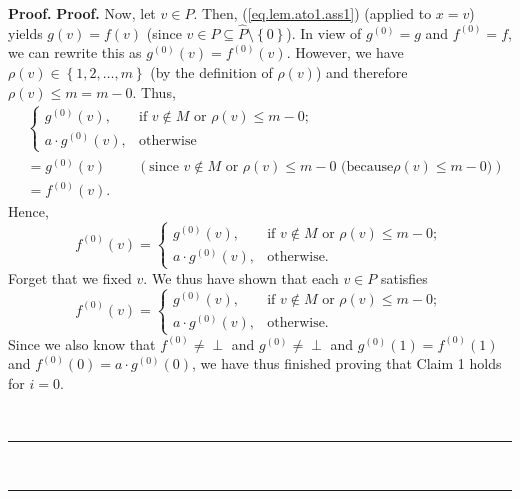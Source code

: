 \documentclass[numbers=enddot,12pt,final,onecolumn,notitlepage]{scrartcl}%
\theoremstyle{definition}
\newenvironment{verlong}{}{}
\newcommand{\undf}{\operatorname*{\bot}}
\newenvironment{proof}[1][Proof]{\noindent\textbf{#1.} }{\ \rule{0.5em}{0.5em}}
\begin{document}
\begin{verlong}
\begin{proof}
\begin{proof}
Now, let $v\in P$. Then, (\ref{eq.lem.ato1.ass1}) (applied to $x=v$) yields
$g\left(  v\right)  =f\left(  v\right)  $ (since $v\in P\subseteq
\widehat{P}\setminus\left\{  0\right\}  $). In view of $g^{\left(  0\right)
}=g$ and $f^{\left(  0\right)  }=f$, we can rewrite this as $g^{\left(
0\right)  }\left(  v\right)  =f^{\left(  0\right)  }\left(  v\right)  $.
However, we have $\rho\left(  v\right)  \in\left\{  1,2,\ldots,m\right\}  $
(by the definition of $\rho\left(  v\right)  $) and therefore $\rho\left(
v\right)  \leq m=m-0$. Thus,%
\begin{align*}
&
\begin{cases}
g^{\left(  0\right)  }\left(  v\right)  , & \text{if }v\notin M\text{ or }%
\rho\left(  v\right)  \leq m-0;\\
a\cdot g^{\left(  0\right)  }\left(  v\right)  , & \text{otherwise}%
\end{cases}
\\
&  =g^{\left(  0\right)  }\left(  v\right)  \ \ \ \ \ \ \ \ \ \ \left(
\text{since }v\notin M\text{ or }\rho\left(  v\right)  \leq m-0\text{ (because
}\rho\left(  v\right)  \leq m-0\text{)}\right) \\
&  =f^{\left(  0\right)  }\left(  v\right)  .
\end{align*}
Hence,
\[
f^{\left(  0\right)  }\left(  v\right)  =%
\begin{cases}
g^{\left(  0\right)  }\left(  v\right)  , & \text{if }v\notin M\text{ or }%
\rho\left(  v\right)  \leq m-0;\\
a\cdot g^{\left(  0\right)  }\left(  v\right)  , & \text{otherwise.}%
\end{cases}
\]
Forget that we fixed $v$. We thus have shown that each $v\in P$ satisfies%
\[
f^{\left(  0\right)  }\left(  v\right)  =%
\begin{cases}
g^{\left(  0\right)  }\left(  v\right)  , & \text{if }v\notin M\text{ or }%
\rho\left(  v\right)  \leq m-0;\\
a\cdot g^{\left(  0\right)  }\left(  v\right)  , & \text{otherwise.}%
\end{cases}
\]
Since we also know that $f^{\left(  0\right)  }\neq\undf$ and $g^{\left(
0\right)  }\neq\undf$ and $g^{\left(  0\right)  }\left(  1\right)  =f^{\left(
0\right)  }\left(  1\right)  $ and $f^{\left(  0\right)  }\left(  0\right)
=a\cdot g^{\left(  0\right)  }\left(  0\right)  $, we have thus finished
proving that Claim 1 holds for $i=0$.


\end{proof}
\end{proof}
\end{verlong}
\end{document}
